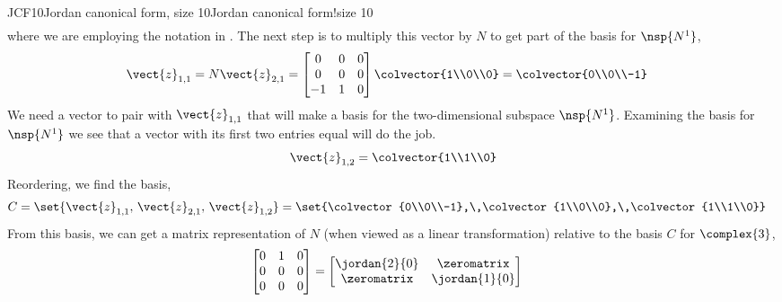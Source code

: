 \begin{example}{JCF10}{Jordan canonical form, size 10}{Jordan canonical form!size 10}
\begin{align*}
\end{align*}
%
where we are employing the notation in .  The next step is to multiply this vector by $N$ to get part of the basis for $\nsp{N^1}$,
%
\begin{align*}
\vect{z}_{1,1}&=
N\vect{z}_{2,1}=
\begin{bmatrix}
0 & 0 & 0 \\
0 & 0 & 0 \\
-1 & 1 & 0
\end{bmatrix}
\colvector{1\\0\\0}
=
\colvector{0\\0\\-1}
\end{align*}
%
We need a vector to pair with $\vect{z}_{1,1}$ that will make a basis for the two-dimensional subspace $\nsp{N^1}$.  Examining the basis for $\nsp{N^1}$ we see that a vector with its first two entries equal will do the job.
%
\begin{align*}
\vect{z}_{1,2}=\colvector{1\\1\\0}
\end{align*}
%
Reordering, we find the basis,
%
\begin{align*}
C
&=\set{\vect{z}_{1,1},\,\vect{z}_{2,1},\,\vect{z}_{1,2}}
=\set{\colvector{0\\0\\-1},\,\colvector{1\\0\\0},\,\colvector{1\\1\\0}}
\end{align*}
%
From this basis, we can get a matrix representation of $N$ (when viewed as a linear transformation) relative to the basis $C$ for $\complex{3}$,
%
\begin{align*}
\begin{bmatrix}
0 & 1 & 0 \\
0 & 0 & 0 \\
0 & 0 & 0
\end{bmatrix}
&=
\begin{bmatrix}
\jordan{2}{0} & \zeromatrix \\
\zeromatrix & \jordan{1}{0} \\
\end{bmatrix}
%
\end{align*}
%

\end{example}
